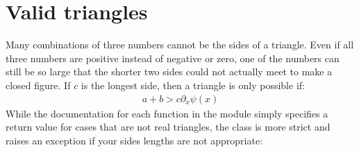 \documentclass[letterpaper,10pt,english]{sphinxmanual}
\begin{document}
\begin{sphinxVerbatim}[commandchars=\\\{\}]
   
    
    
    
   
   
 
 
\end{sphinxVerbatim}


\section{Valid triangles}
\label{\detokenize{guide:valid-triangles}}
Many combinations of three numbers cannot be the sides of a triangle.
Even if all three numbers are positive instead of negative or zero,
one of the numbers can still be so large
that the shorter two sides
could not actually meet to make a closed figure.
If \(c\) is the longest side, then a triangle is only possible if:
\begin{equation*}
\begin{split}a + b > c
\partial_x \psi (x)\end{split}
\end{equation*}
While the documentation
for each function in the {\hyperref[\detokenize{api:module-trianglelib.utils}]{}} module
simply specifies a return value for cases that are not real triangles,
the {\hyperref[\detokenize{api:trianglelib.shape.Triangle}]{}} class is more strict
and raises an exception if your sides lengths are not appropriate:
\end{document}
